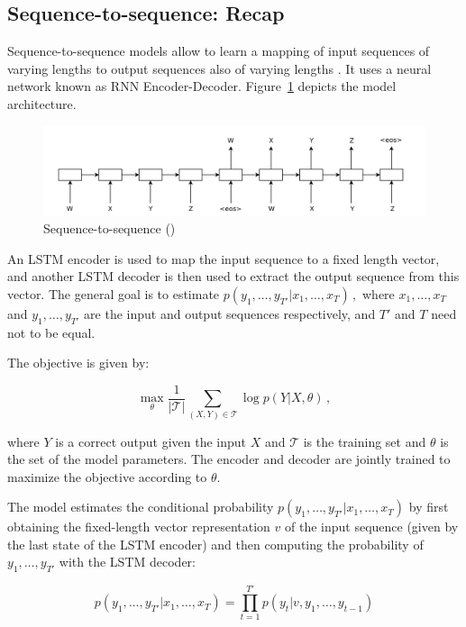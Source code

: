 \documentclass[12pt]{article}\pagestyle{myheadings}
\newcommand{\T}{\mathcal{T}}
\begin{document}
\subsection{Sequence-to-sequence: Recap} 
Sequence-to-sequence models allow to learn a mapping of input sequences of varying lengths to output sequences also of varying lengths \citep{SutskeverVL14}. It uses a neural network known as RNN Encoder-Decoder. Figure~\ref{fig:seq2seq} depicts the model architecture. 
\begin{figure}[ht]
\centering
\includegraphics[width=1.0\linewidth]{figures/seq2seq.png}
\caption{\label{fig:seq2seq}Sequence-to-sequence (\citet{SutskeverVL14})}
\end{figure}
An LSTM encoder is used to map the input sequence to a fixed length vector, and another LSTM decoder is then used to extract the output sequence from this vector. The general goal is to estimate 
$
p(y_1,\ldots,y_{T'} | x_1, \ldots, x_T)\,,
$
where $x_1, \ldots, x_T$ and  $y_1,\ldots,y_{T'}$ are the input and output sequences respectively, and $T'$ and $T$ need not to be equal. 

The objective is given by:

\begin{equation}
\max_{\theta} \frac{1}{|\T|} \sum_{(X,Y) \in \T} \log p(Y|X,\theta) \,,
\label{eq:seq2seq_obj}
\end{equation}

where $Y$ is a correct output given the input $X$ and $\T$ is the training set and $\theta$ is the set of the model parameters. 
The encoder and decoder are jointly trained to maximize the objective according to $\theta$.

The model estimates the conditional probability $p(y_1,\ldots,y_{T'} | x_1, \ldots, x_T)$ by first obtaining the fixed-length vector representation $v$ of the input sequence (given by the last state of the LSTM encoder) and then computing the probability of $y_1,\ldots,y_{T'} $ with the LSTM decoder: 

\begin{equation}
p(y_1,\ldots,y_{T'} | x_1, \ldots, x_T) = \prod_{t=1}^{T'} p(y_t|v, y_1,\ldots,y_{t-1})
\end{equation}
\end{document}
